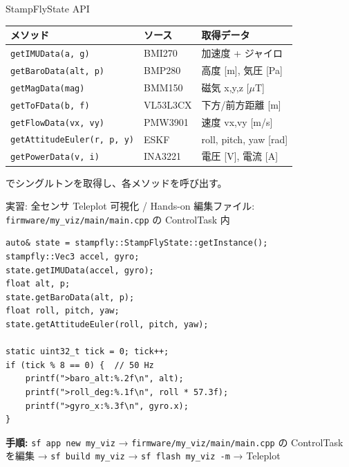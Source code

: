 \begin{frame}{StampFlyState API}
  {\small
  \begin{tabular}{lll}
    \hline
    \textbf{メソッド} & \textbf{ソース} & \textbf{取得データ} \\
    \hline
    \texttt{getIMUData(a, g)}           & BMI270          & 加速度 + ジャイロ \\
    \texttt{getBaroData(alt, p)}        & BMP280          & 高度 [m], 気圧 [Pa] \\
    \texttt{getMagData(mag)}            & BMM150          & 磁気 x,y,z [$\mu$T] \\
    \texttt{getToFData(b, f)}           & VL53L3CX        & 下方/前方距離 [m] \\
    \texttt{getFlowData(vx, vy)}        & PMW3901         & 速度 vx,vy [m/s] \\
    \texttt{getAttitudeEuler(r, p, y)}  & ESKF            & roll, pitch, yaw [rad] \\
    \texttt{getPowerData(v, i)}         & INA3221         & 電圧 [V], 電流 [A] \\
    \hline
  \end{tabular}
  }

  \vspace{0.5em}
  {\footnotesize
     でシングルトンを取得し、各メソッドを呼び出す。
  }
\end{frame}

\begin{frame}[fragile]{実習: 全センサ Teleplot 可視化 / Hands-on}
  {\small 編集ファイル: \texttt{firmware/my\_viz/main/main.cpp} の ControlTask 内}

  \vspace{0.3em}

  \begin{lstlisting}[style=sfcpp, basicstyle=\ttfamily\scriptsize]
auto& state = stampfly::StampFlyState::getInstance();
stampfly::Vec3 accel, gyro;
state.getIMUData(accel, gyro);
float alt, p;
state.getBaroData(alt, p);
float roll, pitch, yaw;
state.getAttitudeEuler(roll, pitch, yaw);

static uint32_t tick = 0; tick++;
if (tick % 8 == 0) {  // 50 Hz
    printf(">baro_alt:%.2f\n", alt);
    printf(">roll_deg:%.1f\n", roll * 57.3f);
    printf(">gyro_x:%.3f\n", gyro.x);
}
  \end{lstlisting}

  {\footnotesize
    \textbf{手順:} \texttt{sf app new my\_viz} → \texttt{firmware/my\_viz/main/main.cpp} の
    ControlTask を編集 → \texttt{sf build my\_viz} → \texttt{sf flash my\_viz -m} → Teleplot
  }
\end{frame}

